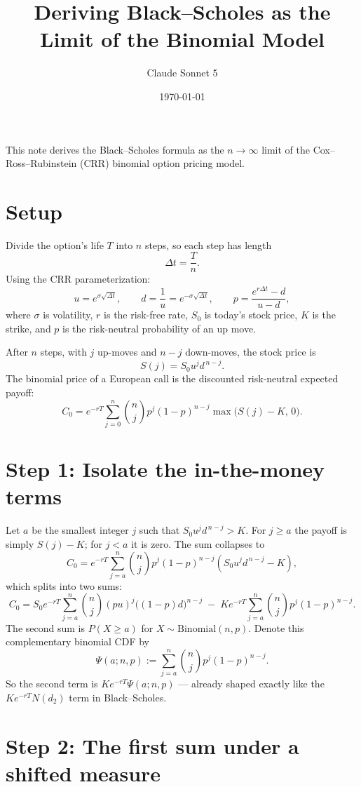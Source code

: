 \documentclass[11pt]{article}
\title{Deriving Black--Scholes as the Limit of the Binomial Model}
\author{Claude Sonnet 5}
\date{\today}
\begin{document}
\maketitle

This note derives the Black--Scholes formula as the $n \to \infty$ limit of the
Cox--Ross--Rubinstein (CRR) binomial option pricing model.

\section*{Setup}

Divide the option's life $T$ into $n$ steps, so each step has length
\[
  \Delta t = \frac{T}{n}.
\]
Using the CRR parameterization:
\[
  u = e^{\sigma \sqrt{\Delta t}}, \qquad
  d = \frac{1}{u} = e^{-\sigma \sqrt{\Delta t}}, \qquad
  p = \frac{e^{r \Delta t} - d}{u - d},
\]
where $\sigma$ is volatility, $r$ is the risk-free rate, $S_0$ is today's stock price,
$K$ is the strike, and $p$ is the risk-neutral probability of an up move.

After $n$ steps, with $j$ up-moves and $n-j$ down-moves, the stock price is
\[
  S(j) = S_0 u^j d^{\,n-j}.
\]
The binomial price of a European call is the discounted risk-neutral expected payoff:
\[
  C_0 = e^{-rT} \sum_{j=0}^{n} \binom{n}{j} p^j (1-p)^{n-j} \max\big(S(j) - K,\, 0\big).
\]

\section*{Step 1: Isolate the in-the-money terms}

Let $a$ be the smallest integer $j$ such that $S_0 u^j d^{\,n-j} > K$. For $j \ge a$ the
payoff is simply $S(j) - K$; for $j < a$ it is zero. The sum collapses to
\[
  C_0 = e^{-rT} \sum_{j=a}^{n} \binom{n}{j} p^j (1-p)^{n-j} \left( S_0 u^j d^{\,n-j} - K \right),
\]
which splits into two sums:
\[
  C_0 = S_0 e^{-rT} \sum_{j=a}^{n} \binom{n}{j} (pu)^j \big((1-p)d\big)^{n-j}
        \;-\; K e^{-rT} \sum_{j=a}^{n} \binom{n}{j} p^j (1-p)^{n-j}.
\]
The second sum is $P(X \ge a)$ for $X \sim \text{Binomial}(n,p)$. Denote this
complementary binomial CDF by
\[
  \Psi(a; n, p) := \sum_{j=a}^{n} \binom{n}{j} p^j (1-p)^{n-j}.
\]
So the second term is $K e^{-rT} \Psi(a; n, p)$ --- already shaped exactly like the
$K e^{-rT} N(d_2)$ term in Black--Scholes.

\section*{Step 2: The first sum under a shifted measure}
\end{document}
